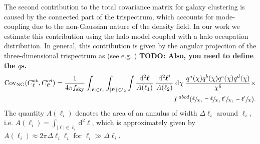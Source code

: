 \documentclass[a4paper,11pt]{article}
\newcommand{\todo}[1]{{\bf TODO: #1}}
\begin{document}
    The second contribution to the total covariance matrix for galaxy clustering is caused by the connected part of the trispectrum, which accounts for mode-coupling due to the non-Gaussian nature of the density field. In our work we estimate this contribution using the halo model coupled with a halo occupation distribution. In general, this contribution is given by the angular projection of the three-dimensional trispectrum as (see e.g. \cite{Krause:2017}) \todo{Also, you need to define the $q$s.}
    \begin{equation}
    \begin{aligned}
      \mathrm{Cov}_{\mathrm{NG}}(C^{ab}_{\ell}, C^{cd}_{\ell'}) = \frac{1}{4 \pi f_{\mathrm{sky}}} \int_{\vert \boldsymbol{\ell} \vert \in \ell_{1}} \int_{\vert \boldsymbol{\ell}' \vert \in \ell_{2}} \int \frac{\mathrm{d}^{2}\boldsymbol{\ell}}{A(\ell_{1})} \; \frac{\mathrm{d}^{2}\boldsymbol{\ell}'}{A(\ell_{2})} \; \mathrm{d}\chi \; \frac{q^{a}(\chi)q^{b}(\chi)q^{c}(\chi)q^{d}(\chi)}{\chi^{6}} \times \\ T^{abcd}(\sfrac{\boldsymbol{\ell}}{\chi}, \sfrac{-\boldsymbol{\ell}}{\chi}, \sfrac{\boldsymbol{\ell}'}{\chi}, \sfrac{-\boldsymbol{\ell}'}{\chi}).
    \end{aligned}
    \end{equation}
    The quantity $A(\ell_{i})$ denotes the area of an annulus of width $\Delta \ell_{i}$ around $\ell_{i}$, i.e. $A(\ell_{i}) = \int_{\vert \boldsymbol{\ell} \vert \in \ell_{i}} \mathrm{d}^{2}\boldsymbol{\ell}$, which is approximately given by $A(\ell_{i}) \approx 2 \pi \Delta \ell_{i} \ell_{i}$ for $\ell_{i} \gg \Delta \ell_{i}$.
    
\end{document}
